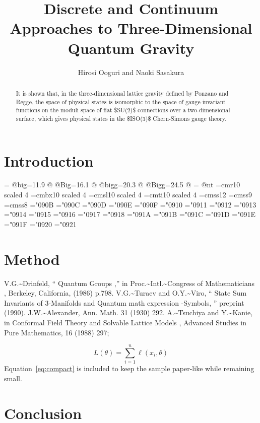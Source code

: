 \documentclass[11pt]{article}
\title{Discrete and Continuum Approaches to Three-Dimensional Quantum Gravity}
\author{Hirosi Ooguri and Naoki Sasakura}
\date{}
\begin{document}
\maketitle
\begin{abstract}

It is shown that, in the three-dimensional lattice gravity defined by Ponzano and Regge, the space of physical states is isomorphic to the space of gauge-invariant functions on the moduli space of flat \$SU(2)\$ connections over a two-dimensional surface, which gives physical states in the \$ISO(3)\$ Chern-Simons gauge theory.

\end{abstract}

\section{Introduction}

= @big=11.9 @ @Big=16.1 @ @bigg=20.3 @ @Bigg=24.5 @ = @nt =cmr10 scaled 4 =cmbx10 scaled 4 =cmsl10 scaled 4 =cmti10 scaled 4 =cmss12 =cmss9 =cmss8 ="090B ="090C ="090D ="090E ="090F ="0910 ="0911 ="0912 ="0913 ="0914 ="0915 ="0916 ="0917 ="0918 ="091A ="091B ="091C ="091D ="091E ="091F ="0920 ="0921

\section{Method}

V.G.\textasciitilde{}Drinfeld, `` Quantum Groups ,'' in Proc.\textasciitilde{}Intl.\textasciitilde{}Congress of Mathematicians , Berkeley, California, (1986) p.798. V.G.\textasciitilde{}Turaev and O.Y.\textasciitilde{}Viro, `` State Sum Invariants of 3-Manifolds and Quantum math expression -Symbols, '' preprint (1990). J.W.\textasciitilde{}Alexander, Ann. Math. 31 (1930) 292. A.\textasciitilde{}Tsuchiya and Y.\textasciitilde{}Kanie, in Conformal Field Theory and Solvable Lattice Models , Advanced Studies in Pure Mathematics, 16 (1988) 297;

\begin{equation}
\label{eq:compact}
L(\theta) = \sum_{i=1}^{n} \ell(x_i, \theta)
\end{equation}
Equation~\ref{eq:compact} is included to keep the sample paper-like while remaining small.

\section{Conclusion}
\end{document}
